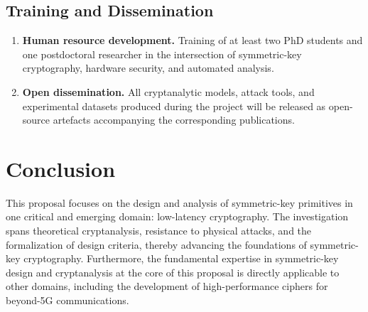 \subsection*{Training and Dissemination}
\begin{enumerate}[label=\textbf{D\arabic*.}, leftmargin=*, itemsep=2pt, start=9]
  \item \textbf{Human resource development.}
        Training of at least two PhD students and one postdoctoral researcher in the intersection of symmetric-key cryptography, hardware security, and automated analysis.

  \item \textbf{Open dissemination.}
        All cryptanalytic models, attack tools, and experimental datasets produced during the project will be released as open-source artefacts accompanying the corresponding publications.
\end{enumerate}

\section*{Conclusion}

This proposal focuses on the design and analysis of symmetric-key primitives in one critical and emerging domain: low-latency cryptography.
The investigation spans theoretical cryptanalysis, resistance to physical attacks, and the formalization of design criteria, thereby advancing the foundations of symmetric-key cryptography.
Furthermore, the fundamental expertise in symmetric-key design and cryptanalysis at the core of this proposal is directly applicable to other domains, including the development of high-performance ciphers for beyond-5G communications.

\pagebreak




